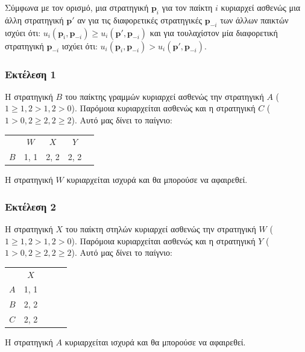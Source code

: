 Σύμφωνα με τον ορισμό, μια στρατηγική $\textbf{p}_i$ για τον παίκτη $i$
κυριαρχεί ασθενώς μια άλλη στρατηγική $\textbf{p}'$ αν για τις διαφορετικές
στρατηγικές $\textbf{p}_{-i}$ των άλλων παικτών ισχύει ότι:
$u_i(\textbf{p}_i, \textbf{p}_{-i}) \geq u_i(\textbf{p}', \textbf{p}_{-i})$ και για
τουλαχίστον μία διαφορετική στρατηγική $\textbf{p}_{-i}$ ισχύει ότι:
$u_i(\textbf{p}_i, \textbf{p}_{-i}) > u_i(\textbf{p}', \textbf{p}_{-i})$.

\subsubsection{Εκτέλεση 1}
Η στρατηγική $B$ του παίκτης γραμμών κυριαρχεί ασθενώς την στρατηγική $A$
($1 \geq 1, 2 > 1, 2 > 0$). Παρόμοια κυριαρχείται ασθενώς και η στρατηγική $C$
($1 > 0, 2 \geq 2, 2 \geq 2$). Αυτό μας δίνει το παίγνιο:
\begin{center}
\begin{tabular}{ccccc}
        & $W$  & $X$  & $Y$ \\
    $B$ & 1, 1 & 2, 2 & 2, 2
\end{tabular}
\end{center}

Η στρατηγική $W$ κυριαρχείται ισχυρά και θα μπορούσε να αφαιρεθεί.

\subsubsection{Εκτέλεση 2}
Η στρατηγική $Χ$ του παίκτη στηλών κυριαρχεί ασθενώς την στρατηγική $W$
($1 \geq 1, 2 > 1, 2 > 0$). Παρόμοια κυριαρχείται ασθενώς και η στρατηγική $Y$
($1 > 0, 2 \geq 2, 2 \geq 2$). Αυτό μας δίνει το παίγνιο:
\begin{center}
\begin{tabular}{ccccc}
        & $X$  \\
    $A$ & 1, 1 \\
    $B$ & 2, 2 \\
    $C$ & 2, 2 \\
\end{tabular}
\end{center}

Η στρατηγική $A$ κυριαρχείται ισχυρά και θα μπορούσε να αφαιρεθεί.
